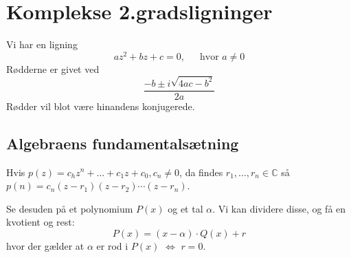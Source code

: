 \section{Komplekse 2.gradsligninger}
Vi har en ligning \begin{equation}
    az^2+bz+c=0,\,\quad\text{ hvor }a\neq0
\end{equation}Rødderne er givet ved \begin{equation}
    \frac{-b\pm i\sqrt{4ac-b^2}}{2a}
\end{equation}
Rødder vil blot være hinandens konjugerede.
\subsection{Algebraens fundamentalsætning}
Hvis $p(z)=c_hz^n+\ldots+c_1z+c_0,c_n\neq0$, da findes $r_1,\ldots,r_n\in\mathbb{C}$ så $p(n)=c_n(z-r_1)(z-r_2)\cdots(z-r_n)$.

Se desuden på et polynomium $P(x)$ og et tal $\alpha$. Vi kan dividere disse, og få en kvotient og rest:$$P(x)=(x-\alpha)\cdot Q(x)+r$$hvor der gælder at $\alpha$ er rod i $P(x)$ $\iff$ $r=0$.